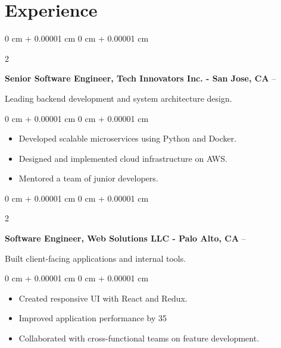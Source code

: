 \documentclass[10pt, letterpaper]{article}
\newenvironment{highlights}{
    \begin{itemize}[
        topsep=0.10 cm,
        parsep=0.10 cm,
        partopsep=0pt,
        itemsep=0pt,
        leftmargin=0 cm + 10pt
    ]
}{
    \end{itemize}
} %
\newenvironment{onecolentry}{
    \begin{adjustwidth}{
        0 cm + 0.00001 cm
    }{
        0 cm + 0.00001 cm
    }
}{
    \end{adjustwidth}
} %
\newenvironment{twocolentry}[2][]{
    \onecolentry
    \def\secondColumn{#2}
    \setcolumnwidth{\fill, 4.5 cm}
    \begin{paracol}{2}
}{
    \switchcolumn \raggedleft \secondColumn
    \end{paracol}
    \endonecolentry
} %
\begin{document}
\vspace{-0.3 cm}
\section{Experience}     
 
    \begin{twocolentry}{
         – 
    }
    \textbf{ Senior Software Engineer, Tech Innovators Inc. - San Jose, CA }\end{twocolentry}
    \vspace{0.10 cm}
    Leading backend development and system architecture design.
    \vspace{0.10 cm}
    \begin{onecolentry}
        \begin{highlights}
             
                \item Developed scalable microservices using Python and Docker.
             
                \item Designed and implemented cloud infrastructure on AWS.
             
                \item Mentored a team of junior developers.
            
        \end{highlights}
    \end{onecolentry}      
    \vspace{0.2 cm}
 
    \begin{twocolentry}{
         – 
    }
    \textbf{ Software Engineer, Web Solutions LLC - Palo Alto, CA }\end{twocolentry}
    \vspace{0.10 cm}
    Built client-facing applications and internal tools.
    \vspace{0.10 cm}
    \begin{onecolentry}
        \begin{highlights}
             
                \item Created responsive UI with React and Redux.
             
                \item Improved application performance by 35%
             
                \item Collaborated with cross-functional teams on feature development.
            
        \end{highlights}
    \end{onecolentry}      
    \vspace{0.2 cm}
\end{document}
